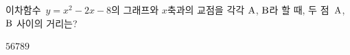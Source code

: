 이차함수~$y=x^2-2x-8$의 그래프와 $x$축과의 교점을 각각 $\mathrm{A}$, $\mathrm{B}$라 할 때, 두 점~$\mathrm{A}$, $\mathrm{B}$ 사이의 거리는?
\begin{choices32}{$5$}{$6$}{$7$}{$8$}{$9$}\end{choices32}
